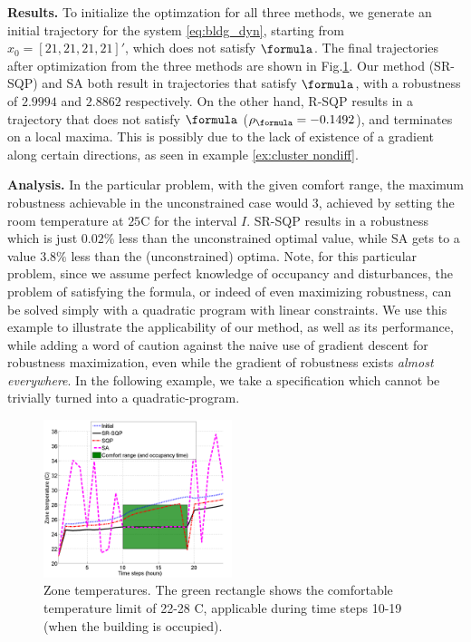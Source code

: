 \textbf{Results.} To initialize the optimzation for all three methods, we generate an initial trajectory for the system \eqref{eq:bldg_dyn}, starting from $x_0=[21,21,21,21]'$, which does not satisfy $\formula$. The final trajectories after optimization from the three methods are shown in Fig.\ref{fig:ZoneTemp}. Our method (SR-SQP) and SA both result in trajectories that satisfy $\formula$, with a robustness of $2.9994$ and $2.8862$ respectively. On the other hand, R-SQP results in a trajectory that does not satisfy $\formula$ ($\rob_{\formula} = -0.1492$), and terminates on a local maxima. This is possibly due to the lack of existence of a gradient along certain directions, as seen in example \ref{ex:cluster nondiff}.

\textbf{Analysis.} In the particular problem, with the given comfort range, the maximum robustness achievable in the unconstrained case would $3$, achieved by setting the room temperature at $25$C for the interval $I$. SR-SQP results in a robustness which is just $0.02\%$ less than the unconstrained optimal value, while SA gets to a value $3.8\%$ less than the (unconstrained) optima. Note, for this particular problem, since we assume perfect knowledge of occupancy and disturbances, the problem of satisfying the formula, or indeed of even maximizing robustness, can be solved simply with a quadratic program with linear constraints. We use this example to illustrate the applicability of our method, as well as its performance, while adding a word of caution against the naive use of gradient descent for robustness maximization, even while the gradient of robustness exists \textit{almost everywhere}. In the following example, we take a specification which cannot be trivially turned into a quadratic-program. %


\begin{figure}[t]
\centering
\includegraphics[width=0.49\textwidth]{figures/ZoneTemp_scissored}
\vspace{-20pt}
\caption{\small{Zone temperatures. The green rectangle shows the comfortable temperature limit of 22-28 C, applicable during time steps 10-19 (when the building is occupied).}}
\label{fig:ZoneTemp}
\vspace{-10pt}
\end{figure}

